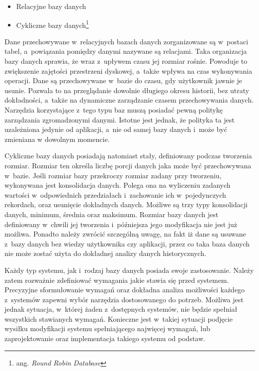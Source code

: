 \begin{itemize}
\item Relacyjne bazy danych
\item Cykliczne bazy danych\footnote{ang. {\em Round Robin Database}}
\end{itemize}

Dane przechowywane w~relacyjnych bazach danych zorganizowane są
w~postaci tabel, a~powiązania pomiędzy danymi nazywane są
relacjami. Taka organizacja bazy danych sprawia, że wraz z~upływem
czasu jej rozmiar rośnie. Powoduje to zwiększenie zajętości
przestrzeni dyskowej, a~także wpływa na czas wykonywania
operacji. Dane są przechowywane w~bazie do czasu, gdy użytkownik
jawnie je usunie. Pozwala to na przeglądanie dowolnie długiego okresu
historii, bez utraty dokładności, a~także na dynamiczne zarządzanie
czasem przechowywania danych. Narzędzia korzystające z~tego typu baz
muszą posiadać pewną politykę zarządzania zgromadzonymi danymi. Istotne
jest jednak, że polityka ta jest uzależniona jedynie od aplikacji,
a~nie od samej bazy danych i~może być zmieniana w dowolnym momencie.

Cykliczne bazy danych posiadają natomiast stały, definiowany podczas
tworzenia rozmiar. Rozmiar ten określa liczbę porcji danych jaka może
być przechowywana w~bazie. Jeśli rozmiar bazy przekroczy rozmiar
zadany przy tworzeniu, wykonywana jest konsolidacja danych. Polega ona
na wyliczeniu zadanych wartości w~odpowiednich przedziałach
i~zachowanie ich w~pojedynczych rekordach, oraz usunięcie dokładnych
danych. Możliwe są trzy typy konsolidacji danych, minimum, średnia
oraz maksimum. Rozmiar bazy danych jest definiowany w~chwili jej
tworzenia i~późniejsza jego modyfikacja nie jest już możliwa. Ponadto
należy zwrócić szczególną uwagę, na fakt iż dane są usuwane z~bazy
danych bez wiedzy użytkownika czy aplikacji, przez co taka baza danych
nie może zostać użyta do dokładnej analizy danych historycznych.

Każdy typ systemu, jak i~rodzaj bazy danych posiada swoje
zastosowanie. Należy zatem rozważnie zdefiniować wymagania jakie
stawia się przed systemem. Precyzyjne sformułowanie wymagań oraz
dokładna analiza możliwości każdego z~systemów zapewni wybór narzędzia
dostosowanego do potrzeb. Możliwa jest jednak sytuacja, w~której żaden
z~dostępnych systemów, nie będzie spełniał wszystkich stawianych
wymagań. Konieczne jest w~takiej sytuacji podjęcie wysiłku modyfikacji
systemu spełniającego najwięcej wymagań, lub zaprojektowanie oraz
implementacja takiego systemu od podstaw.

